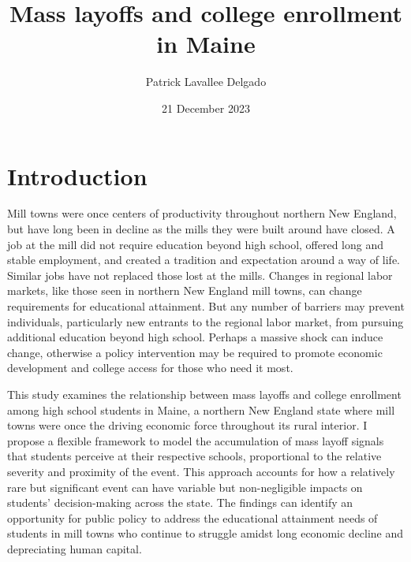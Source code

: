 \documentclass[12pt,letterpaper]{article}
\title{Mass layoffs and college enrollment in Maine}
\author{Patrick Lavallee Delgado}
\date{21 December 2023}
\begin{document}

\setlength{\abovedisplayskip}{0em}

\maketitle

\section{Introduction}

Mill towns were once centers of productivity throughout northern New England, but have long been in decline as the mills they were built around have closed. A job at the mill did not require education beyond high school, offered long and stable employment, and created a tradition and expectation around a way of life. Similar jobs have not replaced those lost at the mills. Changes in regional labor markets, like those seen in northern New England mill towns, can change requirements for educational attainment. But any number of barriers may prevent individuals, particularly new entrants to the regional labor market, from pursuing additional education beyond high school. Perhaps a massive shock can induce change, otherwise a policy intervention may be required to promote economic development and college access for those who need it most.

This study examines the relationship between mass layoffs and college enrollment among high school students in Maine, a northern New England state where mill towns were once the driving economic force throughout its rural interior. I propose a flexible framework to model the accumulation of mass layoff signals that students perceive at their respective schools, proportional to the relative severity and proximity of the event. This approach accounts for how a relatively rare but significant event can have variable but non-negligible impacts on students' decision-making across the state. The findings can identify an opportunity for public policy to address the educational attainment needs of students in mill towns who continue to struggle amidst long economic decline and depreciating human capital.
\end{document}
